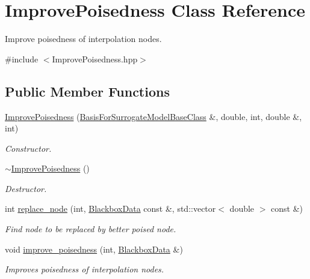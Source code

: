 \hypertarget{class_improve_poisedness}{}\section{Improve\+Poisedness Class Reference}
\label{class_improve_poisedness}


Improve poisedness of interpolation nodes.  




{\ttfamily \#include $<$Improve\+Poisedness.\+hpp$>$}

\subsection*{Public Member Functions}
\begin{DoxyCompactItemize}
\item 
\hyperlink{class_improve_poisedness_a08f87ccd9f7f626f6581fc0fa398fef3}{Improve\+Poisedness} (\hyperlink{class_basis_for_surrogate_model_base_class}{Basis\+For\+Surrogate\+Model\+Base\+Class} \&, double, int, double \&, int)
\begin{DoxyCompactList}\small\item\em Constructor. \end{DoxyCompactList}\item 
\hyperlink{class_improve_poisedness_a9142e131f9cca9115cfa436d9c153a2f}{$\sim$\+Improve\+Poisedness} ()\hypertarget{class_improve_poisedness_a9142e131f9cca9115cfa436d9c153a2f}{}\label{class_improve_poisedness_a9142e131f9cca9115cfa436d9c153a2f}

\begin{DoxyCompactList}\small\item\em Destructor. \end{DoxyCompactList}\item 
int \hyperlink{class_improve_poisedness_af29da8fd8e8b66860bf7e39fd48ed2ad}{replace\+\_\+node} (int, \hyperlink{struct_blackbox_data}{Blackbox\+Data} const \&, std\+::vector$<$ double $>$ const \&)
\begin{DoxyCompactList}\small\item\em Find node to be replaced by better poised node. \end{DoxyCompactList}\item 
void \hyperlink{class_improve_poisedness_a38f6287a8bc2a11f72a6cd8c6dc9da3a}{improve\+\_\+poisedness} (int, \hyperlink{struct_blackbox_data}{Blackbox\+Data} \&)
\begin{DoxyCompactList}\small\item\em Improves poisedness of interpolation nodes. \end{DoxyCompactList}\end{DoxyCompactItemize}
